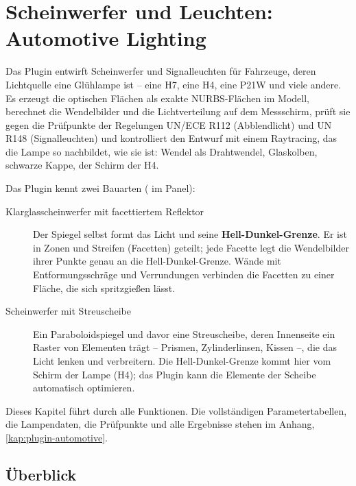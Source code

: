 \chapter{Scheinwerfer und Leuchten: Automotive Lighting}\label{kap:automotive}

Das Plugin  entwirft Scheinwerfer und Signalleuchten für Fahrzeuge,
deren Lichtquelle eine Glühlampe ist -- eine H7, eine H4, eine P21W und viele andere. Es erzeugt
die optischen Flächen als exakte NURBS-Flächen im Modell, berechnet die Wendelbilder und die
Lichtverteilung auf dem Messschirm, prüft sie gegen die Prüfpunkte der Regelungen UN/ECE R112
(Abblendlicht) und UN R148 (Signalleuchten) und kontrolliert den Entwurf mit einem Raytracing, das
die Lampe so nachbildet, wie sie ist: Wendel als Drahtwendel, Glaskolben, schwarze Kappe, der Schirm
der H4.

Das Plugin kennt zwei Bauarten ( im Panel):

\begin{description}
  \item[Klarglasscheinwerfer mit facettiertem Reflektor] Der Spiegel selbst formt das Licht und
    seine \textbf{Hell-Dunkel-Grenze}. Er ist in Zonen und Streifen (Facetten) geteilt; jede Facette
    legt die Wendelbilder ihrer Punkte genau an die Hell-Dunkel-Grenze. Wände mit Entformungsschräge
    und Verrundungen verbinden die Facetten zu einer Fläche, die sich spritzgießen lässt.
  \item[Scheinwerfer mit Streuscheibe] Ein Paraboloidspiegel und davor eine Streuscheibe, deren
    Innenseite ein Raster von Elementen trägt -- Prismen, Zylinderlinsen, Kissen --, die das Licht
    lenken und verbreitern. Die Hell-Dunkel-Grenze kommt hier vom Schirm der Lampe (H4); das Plugin
    kann die Elemente der Scheibe automatisch optimieren.
\end{description}

Dieses Kapitel führt durch alle Funktionen. Die vollständigen Parametertabellen, die Lampendaten,
die Prüfpunkte und alle Ergebnisse stehen im Anhang, \autoref{kap:plugin-automotive}.

\section{Überblick}\label{sec:al-ueberblick}

